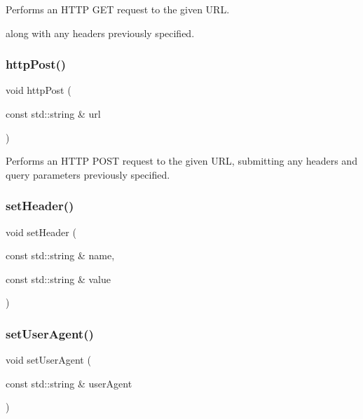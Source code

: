 Performs an H\+T\+TP G\+ET request to the given U\+RL. 

along with any headers previously specified. \mbox{\label{classGDownloader_a68ec0a089bf1b625b86753545e952a57}} 
\subsubsection{\texorpdfstring{http\+Post()}{httpPost()}}
{\footnotesize\ttfamily void http\+Post (\begin{DoxyParamCaption}\item[{const std\+::string \&}]{url }\end{DoxyParamCaption})}



Performs an H\+T\+TP P\+O\+ST request to the given U\+RL, submitting any headers and query parameters previously specified. 

\mbox{\label{classGDownloader_af7065da3945b84ffb547b8bad9ddf8dc}} 
\subsubsection{\texorpdfstring{set\+Header()}{setHeader()}}
{\footnotesize\ttfamily void set\+Header (\begin{DoxyParamCaption}\item[{const std\+::string \&}]{name,  }\item[{const std\+::string \&}]{value }\end{DoxyParamCaption})}

\mbox{\label{classGDownloader_a766286050e9b8fe08919f8353ecb4031}} 
\subsubsection{\texorpdfstring{set\+User\+Agent()}{setUserAgent()}}
{\footnotesize\ttfamily void set\+User\+Agent (\begin{DoxyParamCaption}\item[{const std\+::string \&}]{user\+Agent }\end{DoxyParamCaption})}

